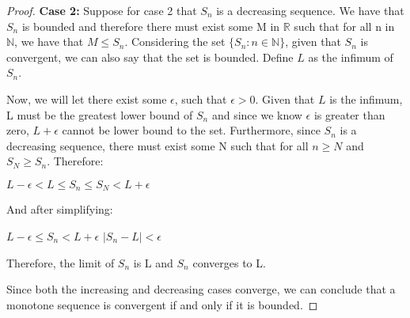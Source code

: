 \documentclass[a4paper,12pt]{article}
\newcommand{\R}{\mathbb{R}}
\newcommand{\N}{\mathbb{N}}
\begin{document}
\begin{proof}
    \textbf{Case 2:} Suppose for case 2 that $S_{n}$ is a decreasing sequence. We have that $S_{n}$ is bounded and therefore there must exist some M in $\R$ such that for all n in $\N$, we have that $M \leq S_{n}$. Considering the set $\{S_{n}: n \in \N\}$, given that $S_{n}$ is convergent, we can also say that the set is bounded. Define $L$ as the infimum of $S_{n}$.
    
    Now, we will let there exist some $\epsilon$, such that $\epsilon>0$. Given that $L$ is the infimum, L must be the greatest lower bound of $S_{n}$ and since we know $\epsilon$ is greater than zero, $L + \epsilon$ cannot be lower bound to the set. Furthermore, since $S_{n}$ is a decreasing sequence, there must exist some N such that for all $n \geq N$ and $S_{N}\geq S_{n}$. Therefore:
    \begin{center}
        $L-\epsilon<L\leq S_{n}\leq S_{N} < L+\epsilon$
    \end{center}
    And after simplifying:
     \begin{center}
        $L-\epsilon\leq S_{n}< L+\epsilon$
        $|S_{n}-L|<\epsilon$
    \end{center}
    Therefore, the limit of $S_{n}$ is L and $S_{n}$ converges to L.
    \vspace{2mm}

    Since both the increasing and decreasing cases converge, we can conclude that a monotone sequence is convergent if and only if it is bounded.
    
\end{proof}
    
\end{document}
